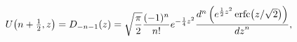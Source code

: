 \[\mathop{U\/}\nolimits\!\left(n+\tfrac{1}{2},z\right)=\mathop{D_{-n-1}\/}%
\nolimits\!\left(z\right)=\sqrt{\frac{\pi}{2}}\frac{(-1)^{n}}{n!}e^{-\frac{1}{%
4}z^{2}}\frac{{d}^{n}\left(e^{\frac{1}{2}z^{2}}\mathop{\mathrm{erfc}\/}%
\nolimits\!\left(z/\sqrt{2}\right)\right)}{{dz}^{n}},\]